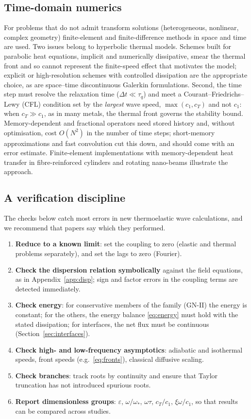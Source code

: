 \subsection{Time-domain numerics}
For problems that do not admit transform solutions (heterogeneous, nonlinear, complex geometry) finite-element and finite-difference methods in space and time are used. Two issues belong to hyperbolic thermal models. Schemes built for parabolic heat equations, implicit and numerically dissipative, smear the thermal front and so cannot represent the finite-speed effect that motivates the model; explicit or high-resolution schemes with controlled dissipation are the appropriate choice, as are space--time discontinuous Galerkin formulations. Second, the time step must resolve the relaxation time ($\Delta t\ll\tau_q$) and meet a Courant--Friedrichs--Lewy (CFL) condition set by the \emph{largest} wave speed, $\max(c_1,c_T)$ and not $c_1$: when $c_T\gg c_1$, as in many metals, the thermal front governs the stability bound. Memory-dependent and fractional operators need stored history and, without optimisation, cost $O(N^2)$ in the number of time steps; short-memory approximations and fast convolution cut this down, and should come with an error estimate. Finite-element implementations with memory-dependent heat transfer in fibre-reinforced cylinders \citep{Sur2019} and rotating nano-beams \citep{Sur2025} illustrate the approach.

\subsection{A verification discipline}
The checks below catch most errors in new thermoelastic wave calculations, and we recommend that papers say which they performed.
\begin{enumerate}
\item \textbf{Reduce to a known limit}: set the coupling to zero (elastic and thermal problems separately), and set the lags to zero (Fourier).
\item \textbf{Check the dispersion relation symbolically} against the field equations, as in Appendix~\ref{app:disp}; sign and factor errors in the coupling terms are detected immediately.
\item \textbf{Check energy}: for conservative members of the family (GN-II) the energy is constant; for the others, the energy balance \eqref{eq:energy} must hold with the stated dissipation; for interfaces, the net flux must be continuous (Section~\ref{sec:interfaces}).
\item \textbf{Check high- and low-frequency asymptotics}: adiabatic and isothermal speeds, front speeds (e.g.\ \eqref{eq:fronts}), classical diffusive scaling.
\item \textbf{Check branches}: track roots by continuity and ensure that Taylor truncation has not introduced spurious roots.
\item \textbf{Report dimensionless groups}: $\varepsilon$, $\omega/\omega_*$, $\omega\tau$, $c_T/c_1$, $\xi\omega/c_1$, so that results can be compared across studies.
\end{enumerate}


